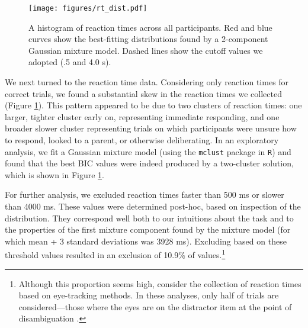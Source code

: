 \documentclass[man,noapacite]{apa2}
\begin{document}



\begin{figure}[t] 
  \begin{center} 
    \texttt{[image: figures/rt\_dist.pdf]} 
    \caption{\label{fig:rtdist} A histogram of reaction times across all participants. Red and blue curves show the best-fitting distributions found by a 2-component Gaussian mixture model. Dashed lines show the cutoff values we adopted (.5 and 4.0 s).}
  \end{center} 
\end{figure}

We next turned to the reaction time data. Considering only reaction times for correct trials, we found a substantial skew in the reaction times we collected (Figure \ref{fig:rtdist}). This pattern appeared to be due to two clusters of reaction times: one larger, tighter cluster early on, representing immediate responding, and one broader slower cluster representing trials on which participants were unsure how to respond, looked to a parent, or otherwise deliberating. In an exploratory analysis, we fit a Gaussian mixture model (using the \texttt{mclust} package in \texttt{R}) and found that the best BIC values were indeed produced by a two-cluster solution, which is shown in Figure \ref{fig:rtdist}. 

For further analysis, we excluded reaction times faster than 500 ms or slower than 4000 ms. These values were determined post-hoc, based on inspection of the distribution. They correspond well both to our intuitions about the task and to the properties of the first mixture component found by the mixture model (for which mean + 3 standard deviations was 3928 ms). Excluding based on these threshold values resulted in an exclusion of 10.9\% of values.\footnote{Although this proportion seems high, consider the collection of reaction times based on eye-tracking methods. In these analyses, only half of trials are considered---those where the eyes are on the distractor item at the point of disambiguation \cite{fernald2008}.}
\end{document}
